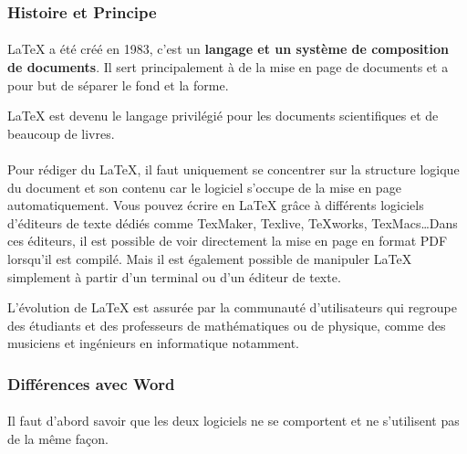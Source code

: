 \subsubsection{Histoire et Principe}

\paragraph{} \LaTeX{} a été créé en 1983, c'est un \textbf{langage et un
système de composition de documents}. Il sert principalement à de la mise en
page de documents et a pour but de séparer le fond et la forme.

\LaTeX{} est devenu le langage privilégié pour les documents scientifiques et
de beaucoup de livres.

\paragraph{} Pour rédiger du \LaTeX, il faut uniquement se concentrer sur la
structure logique du document et son contenu car le logiciel s'occupe de la
mise en page automatiquement. Vous pouvez écrire en \LaTeX{} grâce à différents
logiciels d’éditeurs de texte dédiés comme TexMaker, Texlive, TeXworks,
TexMacs\ldots Dans ces éditeurs, il est possible de voir directement la mise en
page en format PDF lorsqu'il est compilé. Mais il est également possible de
manipuler \LaTeX{} simplement à partir d'un terminal ou d'un éditeur de texte.

L'évolution de \LaTeX{} est assurée par la communauté d'utilisateurs qui
regroupe des étudiants et des professeurs de mathématiques ou de physique,
comme des musiciens et ingénieurs en informatique notamment.

\subsubsection{Différences avec Word}

\paragraph{} Il faut d'abord savoir que les deux logiciels ne se comportent et
ne s'utilisent pas de la même façon.

